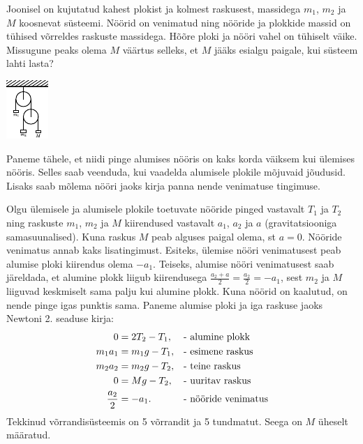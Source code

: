 
Joonisel on kujutatud kahest plokist ja kolmest raskusest, massidega $m_1$, $m_2$ ja $M$ koosnevat süsteemi. Nöörid on venimatud ning nööride ja plokkide massid on tühised võrreldes raskuste massidega. Hõõre ploki ja nööri vahel on tühiselt väike. Missugune peaks olema $M$ väärtus selleks, et $M$ jääks esialgu paigale, kui süsteem lahti lasta?

\begin{center}
	\vspace{-10pt}
	\includegraphics[width = 0.3\linewidth] {2017-lahg-08-double_pulleys_img.pdf}
\end{center}

\hint
Paneme tähele, et niidi pinge alumises nööris on kaks korda väiksem kui ülemises nööris. Selles saab veenduda, kui vaadelda alumisele plokile mõjuvaid jõudusid. Lisaks saab mõlema nööri jaoks kirja panna nende venimatuse tingimuse.

\solu
Olgu ülemisele ja alumisele plokile toetuvate nööride pinged vastavalt $T_1$ ja $T_2$ ning raskuste $m_1$, $m_2$ ja $M$ kiirendused vastavalt $a_1$, $a_2$ ja $a$ (gravitatsiooniga samasuunalised). Kuna raskus $M$ peab alguses paigal olema, st $a = 0$. Nööride venimatus annab kaks lisatingimust. Esiteks, ülemise nööri venimatusest peab alumise ploki kiirendus olema $-a_1$. Teiseks, alumise nööri venimatusest saab järeldada, et alumine plokk liigub kiirendusega $\frac{a_2 + a}{2} = \frac{a_2}{2} = -a_1$, sest $m_2$ ja $M$ liiguvad keskmiselt sama palju kui alumine plokk. Kuna nöörid on kaalutud, on nende pinge igas punktis sama. Paneme alumise ploki ja iga raskuse jaoks Newtoni 2. seaduse kirja:
\begin{align}
0 &= 2T_2 - T_1,				& &\text{- alumine plokk}\label{Plokid:eq-1}\\
m_1a_1 &= m_1g - T_1,			& &\text{- esimene raskus}\label{Plokid:eq-2}\\
m_2a_2 &= m_2g - T_2,			& &\text{- teine raskus}\label{Plokid:eq-3}\\
0 &= Mg - T_2,					& &\text{- uuritav raskus}\label{Plokid:eq-4}\\
\frac{a_2}{2} &= -a_1.			& &\text{- nööride venimatus\label{Plokid:eq-5}}
\end{align}
Tekkinud võrrandisüsteemis on 5 võrrandit ja 5 tundmatut. Seega on $M$ üheselt määratud.

